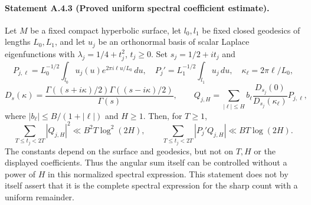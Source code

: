 
\paragraph{Statement A.4.3 (Proved uniform spectral coefficient estimate).}
Let $M$ be a fixed compact hyperbolic surface, let $l_0,l_1$ be fixed
closed geodesics of lengths $L_0,L_1$, and let $u_j$ be an orthonormal
basis of scalar Laplace eigenfunctions with
$\lambda_j=1/4+t_j^2$, $t_j\geq0$. Set $s_j=1/2+it_j$ and
\[
 P_{j,\ell}=L_0^{-1/2}\int_{l_0}u_j(u)e^{2\pi i\ell u/L_0}\,du,
 \quad P_j'=L_1^{-1/2}\int_{l_1}u_j\,du,\quad
 \kappa_\ell=2\pi\ell/L_0,
\]
\[
 D_s(\kappa)=
 \frac{\Gamma((s+i\kappa)/2)\Gamma((s-i\kappa)/2)}{\Gamma(s)},
 \qquad
 Q_{j,H}=\sum_{|\ell|\leq H}b_\ell
             \frac{D_{s_j}(0)}{D_{s_j}(\kappa_\ell)}P_{j,\ell},
\]
where $|b_\ell|\leq B/(1+|\ell|)$ and $H\geq1$. Then, for $T\geq1$,
\begin{equation}\label{A:uniform-arc-period}
 \sum_{T\leq t_j<2T}|Q_{j,H}|^2
       \ll B^2T\log^2(2H),\qquad
 \sum_{T\leq t_j<2T}|P_j'Q_{j,H}|
       \ll BT\log(2H).
\end{equation}
The constants depend on the surface and geodesics, but not on $T,H$
or the displayed coefficients. Thus the angular sum itself can be
controlled without a power of $H$ in this normalized spectral expression.
This statement does not by itself assert that it is the complete
spectral expression for the sharp count with a uniform remainder.
